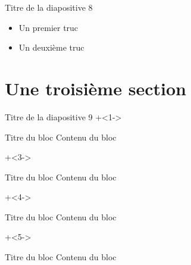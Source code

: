 \documentclass[10pt]{beamer}
\begin{document}
\begin{frame}[fragile]{Titre de la diapositive 8}
    \begin{itemize}[<+- | alert@+>]
      	\item Un premier truc
		\item Un deuxième truc
    \end{itemize}
\end{frame}

\section{Une troisième section}

\begin{frame}{Titre de la diapositive 9}
\onslide+<1->

    \begin{block}{Titre du bloc}
        Contenu du bloc
    \end{block}

\onslide+<3->

    \begin{block}{Titre du bloc}
        Contenu du bloc
    \end{block}
\onslide+<4->

    \begin{block}{Titre du bloc}
        Contenu du bloc
    \end{block}

\onslide+<5->

    \begin{block}{Titre du bloc}
        Contenu du bloc
    \end{block}

\end{frame}
\end{document}
